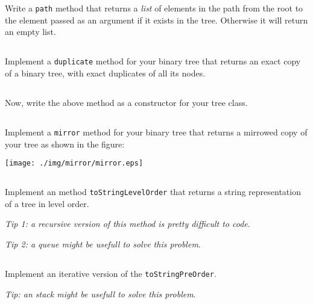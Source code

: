 \documentclass[a4paper, 11pt]{article}
\begin{document}
Write a \texttt{path} method that returns a \emph{list} of elements in the path
from the root to the element passed as an argument if it exists in the tree. Otherwise it will return an empty list.

\subsection{}

Implement a \texttt{duplicate} method for your binary tree that returns an
exact copy of a binary tree, with exact duplicates of all its nodes.

\subsection{}

Now, write the above method as a constructor for your tree class.

\subsection{}

Implement a \texttt{mirror} method for your binary tree that returns a mirrowed
copy of your tree as shown in the figure:

\begin{center}
  \texttt{[image: ./img/mirror/mirror.eps]}
\end{center}

\subsection{}

Implement an method \texttt{toStringLevelOrder} that
returns a string representation of a tree in level order.

\textsl{Tip 1: a recursive version of this method is pretty difficult to code}.

\textsl{Tip 2: a queue might be usefull to solve this problem}.


\subsection{}

Implement an iterative version of the \texttt{toStringPreOrder}.

\textsl{Tip: an stack might be usefull to solve this problem}.
\end{document}
